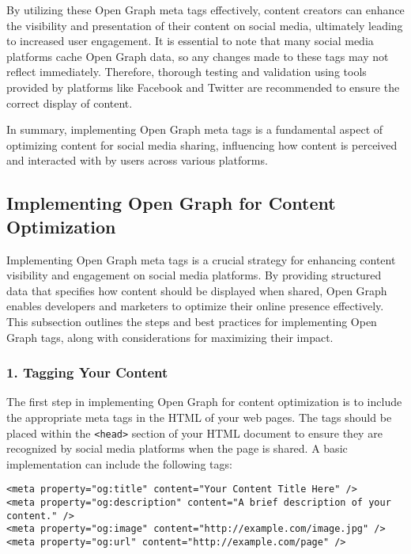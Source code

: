 By utilizing these Open Graph meta tags effectively, content creators can enhance the visibility and presentation of their content on social media, ultimately leading to increased user engagement. It is essential to note that many social media platforms cache Open Graph data, so any changes made to these tags may not reflect immediately. Therefore, thorough testing and validation using tools provided by platforms like Facebook and Twitter are recommended to ensure the correct display of content.

In summary, implementing Open Graph meta tags is a fundamental aspect of optimizing content for social media sharing, influencing how content is perceived and interacted with by users across various platforms.

\subsection{Implementing Open Graph for Content Optimization}
\label{subsec:implementing_open_graph_for_content_optimization}

Implementing Open Graph meta tags is a crucial strategy for enhancing content visibility and engagement on social media platforms. By providing structured data that specifies how content should be displayed when shared, Open Graph enables developers and marketers to optimize their online presence effectively. This subsection outlines the steps and best practices for implementing Open Graph tags, along with considerations for maximizing their impact.

\subsubsection{1. Tagging Your Content}

The first step in implementing Open Graph for content optimization is to include the appropriate meta tags in the HTML of your web pages. The tags should be placed within the \texttt{<head>} section of your HTML document to ensure they are recognized by social media platforms when the page is shared. A basic implementation can include the following tags:

\begin{verbatim}
<meta property="og:title" content="Your Content Title Here" />
<meta property="og:description" content="A brief description of your content." />
<meta property="og:image" content="http://example.com/image.jpg" />
<meta property="og:url" content="http://example.com/page" />
\end{verbatim}

